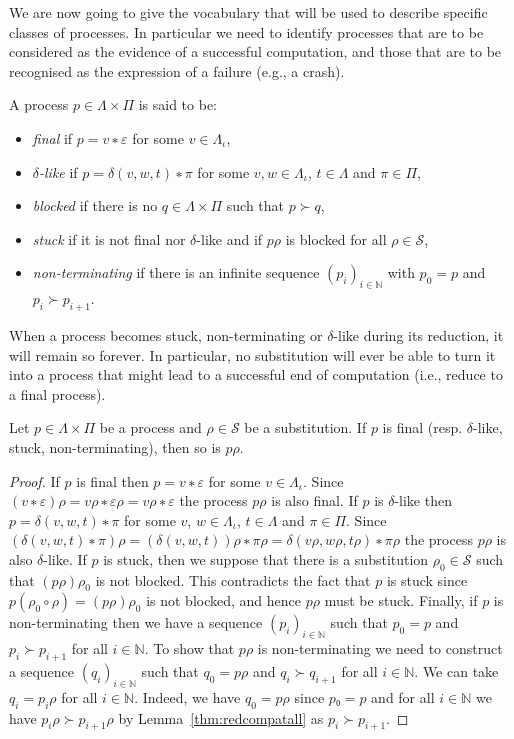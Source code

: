 We are now going to give the vocabulary that will be used to describe specific
classes of processes. In particular we need to identify processes that are to
be considered as the evidence of a successful computation, and those that are
to be recognised as the expression of a failure (e.g., a crash).
\begin{definition}
  A process $p ∈ Λ×Π$ is said to be:
  \begin{itemize}
    \item \emph{final} if $p = v∗ε$ for some $v ∈ Λ_{ι}$,
    \item \emph{$δ$-like} if $p = δ(v,w,t) ∗ π$ for some $v,w ∈ Λ_{ι}$,
      $t ∈ Λ$ and $π ∈ Π$,
    \item \emph{blocked} if there is no $q ∈ Λ×Π$ such that $p ≻ q$,
    \item \emph{stuck} if it is not final nor $δ$-like and if $pρ$ is
      blocked for all $ρ ∈ \mathcal{S}$,
    \item \emph{non-terminating} if there is an infinite sequence
      $(p_i)_{i∈\mathbb{N}}$ with $p_0 = p$ and $p_i ≻ p_{i+1}$.
  \end{itemize}
\end{definition}

When a process becomes stuck, non-terminating or $δ$-like during its
reduction, it will remain so forever. In particular, no substitution
will ever be able to turn it into a process that might lead to a
successful end of computation (i.e., reduce to a final process).
\begin{lemma}\label{lem:redstable}%
  Let $p ∈ Λ×Π$ be a process and $ρ ∈ \mathcal{S}$ be a substitution. If $p$
  is final (resp. $δ$-like, stuck, non-terminating), then so is $pρ$.
\end{lemma}
\begin{proof}
  If $p$ is final then $p = v∗ε$ for some $v ∈ Λ_{ι}$. Since $(v∗ε)ρ =
  vρ∗ερ = vρ∗ε$ the process $pρ$ is also final. If $p$ is $δ$-like then
  $p = δ(v,w,t)∗π$ for some $v$, $w ∈ Λ_{ι}$, $t ∈ Λ$ and $π ∈ Π$. Since
  $(δ(v,w,t)∗π)ρ = (δ(v,w,t))ρ ∗ πρ = δ(vρ,wρ,tρ) ∗ πρ$ the process $pρ$
  is also $δ$-like. If $p$ is stuck, then we suppose that there is a
  substitution $ρ_0 ∈ \mathcal{S}$ such that $(pρ)ρ_0$ is not blocked.
  This contradicts the fact that $p$ is stuck since $p(ρ_0 ∘ ρ) = (pρ)ρ_0$
  is not blocked, and hence $pρ$ must be stuck. Finally, if $p$ is
  non-terminating then we have a sequence $(p_i)_{i∈\mathbb{N}}$ such that
  $p_0 = p$ and $p_i ≻ p_{i+1}$ for all $i ∈ \mathbb{N}$. To show that
  $pρ$ is non-terminating we need to construct a sequence
  $(q_i)_{i∈\mathbb{N}}$ such that $q_0 = pρ$ and $q_i ≻ q_{i+1}$ for
  all $i ∈ \mathbb{N}$. We can take $q_i = p_iρ$ for all $i ∈ \mathbb{N}$.
  Indeed, we have $q_0 = pρ$ since $p₀ = p$ and for all $i ∈ \mathbb{N}$ we
  have $p_iρ ≻ p_{i+1}ρ$ by Lemma~\ref{thm:redcompatall} as $p_i ≻ p_{i+1}$.
\end{proof}

